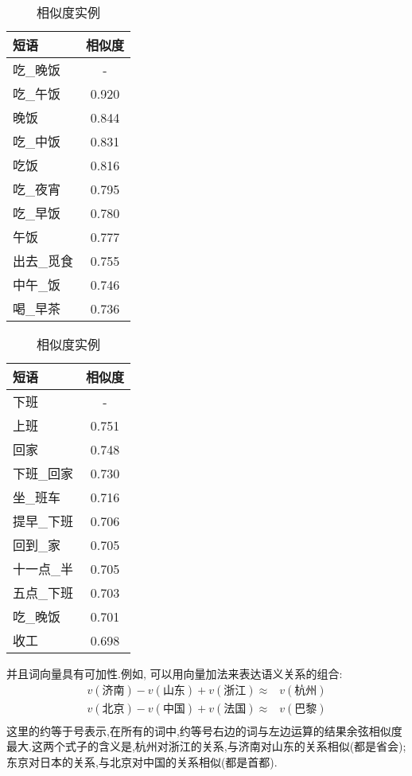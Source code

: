 \begin{table}[h]
\begin{subtable}{0.3\textwidth}
	\begin{tabular}{|l|c|} 
	\hline
	{\heiti 短语} & {\heiti 相似度} \\
	\hline
	吃\_晚饭 & - \\
	\hline
	吃\_午饭 & 0.920 \\
	\hline
	晚饭 & 0.844 \\
	\hline
	吃\_中饭 & 0.831 \\
	\hline
	吃饭 & 0.816 \\
	\hline
	吃\_夜宵 & 0.795 \\
	\hline
	吃\_早饭 & 0.780 \\
	\hline
	午饭 & 0.777 \\
	\hline
	出去\_觅食 & 0.755 \\
	\hline
	中午\_饭 & 0.746 \\
	\hline
	喝\_早茶 & 0.736 \\
	\hline
	\end{tabular}
\end{subtable}
\hspace{1em}
\begin{subtable}{0.3\textwidth}
	\begin{tabular}{|l|c|} 
	\hline
	{\heiti 短语} & {\heiti 相似度} \\
	\hline
	下班 & - \\
	\hline
	上班 & 0.751 \\
	\hline
	回家 & 0.748 \\
	\hline
	下班\_回家 & 0.730 \\
	\hline
	坐\_班车 & 0.716 \\
	\hline
	提早\_下班 & 0.706 \\
	\hline
	回到\_家 & 0.705 \\
	\hline
	十一点\_半 & 0.705 \\
	\hline
	五点\_下班 & 0.703 \\
	\hline
	吃\_晚饭 & 0.701 \\
	\hline
	收工 & 0.698 \\
	\hline
	\end{tabular}
\end{subtable}

\caption{相似度实例}
\end{table}


并且词向量具有可加性.例如, 可以用向量加法来表达语义关系的组合:
\begin{align*}
	v(\text{济南}) - v(\text{山东}) + v(\text{浙江}) \approx & v(\text{杭州}) \\
	v(\text{北京}) - v(\text{中国}) + v(\text{法国}) \approx & v(\text{巴黎}) \\
\end{align*}
这里的约等于号表示,在所有的词中,约等号右边的词与左边运算的结果余弦相似度最大.这两个式子的含义是,杭州对浙江的关系,与济南对山东的关系相似(都是省会); 东京对日本的关系,与北京对中国的关系相似(都是首都).

